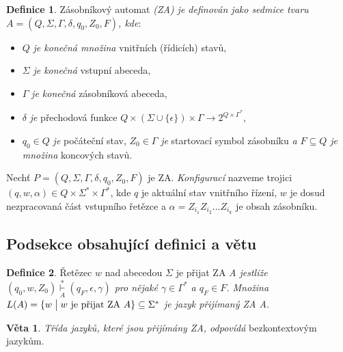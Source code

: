 \documentclass[a4paper,twocolumn,11pt]{article}[06-03-2022]
\theoremstyle{definition}
\newtheorem{theorem}{Definice}
\newtheorem{sentence}{Věta}
\begin{document}
\begin{theorem}\label{def1}
    Zásobníkový automat \emph{(ZA) je definován jako sedmice tvaru $A = (Q, \Sigma, \Gamma, \delta, q_0, Z_0, F)$, kde}: 
    \begin{itemize}
        \item $Q$ \emph{je konečná množina} vnitřních (řídicích) stavů,
        \item $\Sigma$ \emph{je konečná} vstupní abeceda,
        \item $\Gamma$ \emph{je konečná} zásobníková abeceda,
        \item $\delta$ \emph{je} přechodová funkce $Q \times (\Sigma \cup \{\epsilon\}) \times \Gamma \rightarrow 2^{Q \times \Gamma^\ast}$,
        \item $q_0 \in Q$ \emph{je} počáteční stav, $Z_0 \in \Gamma$ \emph{je} startovací symbol zásobníku \emph{a $F \subseteq Q$ je množina} koncových stavů.
    \end{itemize}
\end{theorem}
Nechť $P = (Q, \Sigma, \Gamma, \delta, q_0, Z_0, F)$ je ZA. \emph{Konfigurací} nazveme trojici $(q,w,\alpha) \in Q \times \Sigma^\ast \times \Gamma^\ast$, kde $q$ je aktuální stav vnitřního řízení, $w$ je dosud nezpracovaná část vstupního řetězce a $\alpha = Z_{i_1} Z_{i_2} \ldots Z_{i_k}$ je obsah zásobníku.

\subsection{Podsekce obsahující definici a větu}
\begin{theorem}\label{def2}
    Řetězec $w$ nad abecedou $\Sigma$ je přijat ZA \emph{A jestliže $(q_0, w, Z_0) \overset{\ast}{\underset{A}{\vdash}} (q_F, \epsilon, \gamma)$ pro nějaké $\gamma \in \Gamma^\ast$ a $q_F \in F$.
    Množina $L(A) = \{w \bigm| w \textrm{ je přijat ZA } A \} \subseteq \Sigma^\ast$ je jazyk přijímaný ZA A.}
\end{theorem}
\begin{sentence}
    \emph{Třída jazyků, které jsou přijímány ZA, odpovídá} bezkontextovým jazykům.
\end{sentence}
\end{document}
